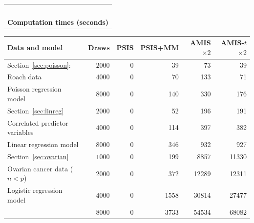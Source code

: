 \documentclass[12pt]{article}
\begin{document}
\begin{table}[tb]
\begin{tabular}{ l r r r r r }
\end{tabular}

\begin{tabular}{ c }
\, \\
\textbf{Computation times (seconds)}  \\
\end{tabular}

\begin{tabular}{ l r r r r r }
\toprule
Data and model & Draws & PSIS & PSIS+MM &  AMIS $\times 2$  & AMIS-$t$ $\times 2$ \\
\midrule
%
%

Section~\ref{sec:poisson}:         & $2000$  & 0 & 39 & 73 & 39  \\
\;Roach data                         & $4000$  & 0 & 70 & 133 & 71 \\
\;Poisson regression model           & $8000$  & 0 & 140 & 330 & 176 \\
\hline     

Section~\ref{sec:linreg}        & $2000$  & 0 & 52      & 196 & 191 \\
\;Correlated predictor variables                              & $4000$  &  0 & 114      & 397 & 382 \\
\;Linear regression model   & $8000$  & 0  & 346      & 932 & 927 \\
   
   \hline
   
Section~\ref{sec:ovarian} & $1000$  & 0 & 199 & 8857 & 11330  \\
\;Ovarian cancer data ($n < p$)             & $2000$  & 0 & 372 & 12289 & 12311  \\
\;Logistic regression model         & $4000$  & 0 & 1558 & 30814 & 27477 \\
      & $8000$  & 0 & 3733 & 54534 & 68082  \\
   
\bottomrule


\end{tabular}
\end{table}
\end{document}
